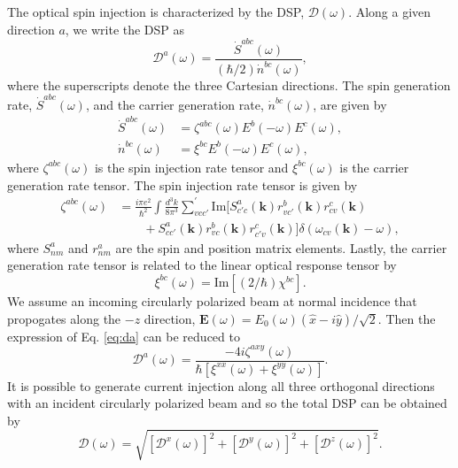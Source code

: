 \documentclass[pss]{wiley2sp} %
\begin{document}
The optical spin injection is characterized by the DSP, $\mathcal{D}(\omega)$.
Along a given direction $a$, we write the DSP \cite{cabellosPRB09} as
\begin{equation}\label{eq:da}
\mathcal{D}^{a}(\omega)=
\frac{\dot{S}^{abc}(\omega)}{(\hbar/2)\dot{n}^{bc}(\omega)},
\end{equation}
where the superscripts denote the three Cartesian directions. The spin
generation rate, $\dot{S}^{abc}(\omega)$, and the carrier generation rate,
$\dot{n}^{bc}(\omega)$, are given by
\begin{align*}
\dot{S}^{abc}(\omega)&= 
\zeta^{abc}(\omega)E^{b}(-\omega)E^{c}(\omega),\nonumber\\
\dot{n}^{bc}(\omega)&= 
\xi^{bc}E^{b}(-\omega)E^{c}(\omega),
\end{align*}
where $\zeta^{abc}(\omega)$ is the spin injection rate tensor and
$\xi^{bc}(\omega)$ is the carrier generation rate tensor. The spin injection
rate tensor is given by
\begin{align*}\label{eq:zeta}
\zeta^{abc}(\omega) &= \frac{i\pi e^{2}}{\hbar^{2}}\int\frac{d^{3}k}{8\pi^{3}}
\sum_{vcc'}^{\prime}\text{Im}\bigl[S^{a}_{c'c}(\textbf{k})
r^{b}_{vc'}(\textbf{k})r^{c}_{cv}(\textbf{k})\nonumber\\
&\qquad+S^{a}_{cc'}(\textbf{k})
r^{b}_{vc}(\textbf{k})r^{c}_{c'v}(\textbf{k})\bigr]
\delta(\omega_{cv}(\textbf{k})-\omega),
\end{align*}
where $S^{a}_{nm}$ and $r^{a}_{nm}$ are the spin and position matrix elements.
Lastly, the carrier generation rate tensor is related to the linear optical
response tensor by
\begin{equation*}
\xi^{bc}(\omega)=\mathrm{Im}[(2/\hbar)\chi^{bc}].
\end{equation*}
We assume an incoming circularly polarized beam at normal incidence that
propogates along the $-z$ direction, $\mathbf{E}(\omega) =
E_{0}(\omega)(\hat{x} - i\hat{y})/\sqrt{2}$. Then the expression of Eq.
\eqref{eq:da} can be reduced to \cite{arzatePRB14}
\begin{equation}\label{eq:D^i}
\mathcal{D}^{a}(\omega) = 
\frac{-4i\zeta^{axy}(\omega)}
    {\hbar\left[\xi^{xx}(\omega) + \xi^{yy}(\omega)\right]}.
\end{equation}
It is possible to generate current injection along all three orthogonal
directions with an incident circularly polarized beam and so the total DSP can
be obtained by \cite{arzatePRB14}
\begin{equation}\label{eq:dsptotal}
\mathcal{D}(\omega) =
\sqrt{[\mathcal{D}^{x}(\omega)]^{2} + 
      [\mathcal{D}^{y}(\omega)]^{2} +
      [\mathcal{D}^{z}(\omega)]^{2}
      }.
\end{equation}
\end{document}
